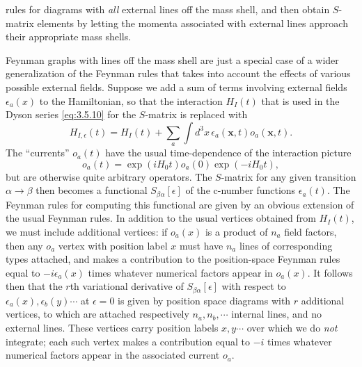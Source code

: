 rules for diagrams with \textit{all} external lines off the mass shell, and then
obtain $S$-matrix elements by letting the momenta associated with external
lines approach their appropriate mass shells.

Feynman graphs with lines off the mass shell are just a special case of a wider
generalization of the Feynman rules that takes into account the effects of
various possible external fields. Suppose we add a sum of terms involving
external fields $\epsilon_a(x)$ to the Hamiltonian, so that the interaction
$H_I(t)$ that is used in the Dyson series \eqref{eq:3.5.10} for the $S$-matrix is
replaced with
\begin{equation}
H_{I,\epsilon}(t)=H_I(t)+\sum_a\int d^3x\,
\epsilon_a(\mathbf x,t)o_a(\mathbf x,t).
\tag{6.4.1}
\label{eq:6.4.1}
\end{equation}
The ``currents'' $o_a(t)$ have the usual time-dependence of the interaction
picture
\begin{equation}
o_a(t)=\exp(iH_0t)o_a(0)\exp(-iH_0t),
\tag{6.4.2}
\label{eq:6.4.2}
\end{equation}
but are otherwise quite arbitrary operators. The $S$-matrix for any given
transition $\alpha\to\beta$ then becomes a functional $S_{\beta\alpha}[\epsilon]$
of the c-number functions $\epsilon_a(t)$. The Feynman rules for computing this
functional are given by an obvious extension of the usual Feynman rules. In
addition to the usual vertices obtained from $H_I(t)$, we must include
additional vertices: if $o_a(x)$ is a product of $n_a$ field factors, then any
$o_a$ vertex with position label $x$ must have $n_a$ lines of corresponding
types attached, and makes a contribution to the position-space Feynman rules
equal to $-i\epsilon_a(x)$ times whatever numerical factors appear in $o_a(x)$.
It follows then that the $r$th variational derivative of
$S_{\beta\alpha}[\epsilon]$ with respect to
$\epsilon_a(x),\epsilon_b(y)\cdots$ at $\epsilon=0$ is given by position space
diagrams with $r$ additional vertices, to which are attached respectively
$n_a,n_b,\cdots$ internal lines, and no external lines. These vertices carry
position labels $x,y\cdots$ over which we do \textit{not} integrate; each such
vertex makes a contribution equal to $-i$ times whatever numerical factors
appear in the associated current $o_a$.

